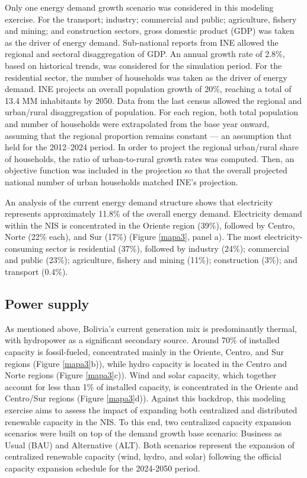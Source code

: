 \documentclass[a4paper,fleqn]{cas-dc}
\begin{document}
Only one energy demand growth scenario was considered in this modeling exercise. For the transport; industry; commercial and public; agriculture, fishery and mining; and construction sectors, gross domestic product (GDP) was taken as the driver of energy demand. Sub-national reports from INE allowed the regional and sectoral disaggregation of GDP. An annual growth rate of 2.8\%, based on historical trends, was considered for the simulation period. For the residential sector, the number of households was taken as the driver of energy demand. INE projects an overall population growth of 20\%, reaching a total of 13.4 MM inhabitants by 2050. Data from the last census allowed the regional and urban/rural disaggregation of population. For each region, both total population and number of households were extrapolated from the base year onward, assuming that the regional proportion remains constant — an assumption that held for the 2012–2024 period. In order to project the regional urban/rural share of households, the ratio of urban-to-rural growth rates was computed. Then, an objective function was included in the projection so that the overall projected national number of urban households matched INE's projection. 

An analysis of the current energy demand structure shows that electricity represents approximately 11.8\% of the overall energy demand. Electricity demand within the NIS is concentrated in the Oriente region (39\%), followed by Centro, Norte (22\% each), and Sur (17\%) (Figure \ref{mapa3}, panel a). The most electricity-consuming sector is residential (37\%), followed by industry (24\%); commercial and public (23\%); agriculture, fishery and mining (11\%); construction (3\%); and transport (0.4\%).

\subsection{Power supply}

As mentioned above, Bolivia's current generation mix is predominantly thermal, with hydropower as a significant secondary source. Around 70\% of installed capacity is fossil-fueled, concentrated mainly in the Oriente, Centro, and Sur regions (Figure \ref{mapa3}b)), while hydro capacity is located in the Centro and Norte regions (Figure \ref{mapa3}c)). Wind and solar capacity, which together account for less than 1\% of installed capacity, is concentrated in the Oriente and Centro/Sur regions (Figure \ref{mapa3}d)).
Against this backdrop, this modeling exercise aims to assess the impact of expanding both centralized and distributed renewable capacity in the NIS. To this end, two centralized capacity expansion scenarios were built on top of the demand growth base scenario: Business as Usual (BAU) and Alternative (ALT). Both scenarios represent the expansion of centralized renewable capacity (wind, hydro, and solar) following the official capacity expansion schedule for the 2024-2050 period.
\end{document}
